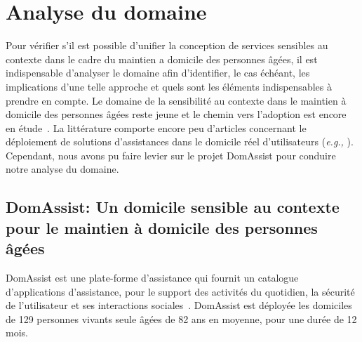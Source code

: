 






\section{Analyse du domaine}
Pour vérifier s'il est possible d'unifier la conception de services sensibles au contexte dans le cadre du maintien a domicile des personnes âgées, il est indispensable d'analyser le domaine afin d'identifier, le cas échéant, les implications d'une telle approche et quels sont les éléments indispensables à prendre en compte.
Le domaine de la sensibilité au contexte dans le maintien à domicile des personnes âgées reste jeune et le chemin vers l'adoption est encore en étude~\cite{kaye2017making}. La littérature comporte encore peu d'articles concernant le déploiement de solutions d'assistances dans le domicile réel d'utilisateurs ({\em e.g.,} \cite{kaye2011intelligent}). Cependant, nous avons pu faire levier sur le projet DomAssist pour conduire notre analyse du domaine.

\subsection{DomAssist: Un domicile sensible au contexte pour le maintien à domicile des personnes âgées}

DomAssist est une plate-forme d'assistance qui fournit un catalogue d'applications d'assistance, pour le support des activités du quotidien, la sécurité de l'utilisateur et ses interactions sociales~\cite{consel2017homeassist}. DomAssist est déployée les domiciles de 129 personnes vivants seule âgées de 82 ans en moyenne, pour une durée de 12 mois.

